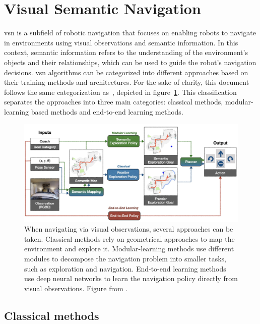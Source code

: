 \section{Visual Semantic Navigation}\label{sec:visual-semantic-navigation}

\acrfull{vsn} is a subfield of robotic navigation that focuses on enabling robots to navigate in environments using visual observations and semantic information.
In this context, semantic information refers to the understanding of the environment's objects and their relationships, which can be used to guide the robot's navigation decisions.
\acrshort{vsn} algorithms can be categorized into different approaches based on their training methods and architectures.
For the sake of clarity, this document follows the same categorization as~\cite{gervet2022}, depicted in figure~\ref{fig:vsn-categories}.
This classification separates the approaches into three main categories: classical methods, modular-learning based methods and end-to-end learning methods.

\begin{figure}
    \centering
    \includegraphics[width=\textwidth]{figures/related_work/methods_overview}
    \caption{When navigating via visual observations, several approaches can be taken.
    Classical methods rely on geometrical approaches to map the environment and explore it.
    Modular-learning methods use different modules to decompose the navigation problem into smaller tasks, such as exploration and navigation.
    End-to-end learning methods use deep neural networks to learn the navigation policy directly from visual observations.
    Figure from \cite{gervet2022}.}
    \label{fig:vsn-categories}
\end{figure}

\subsection{Classical methods}\label{subsec:classical-methods}

